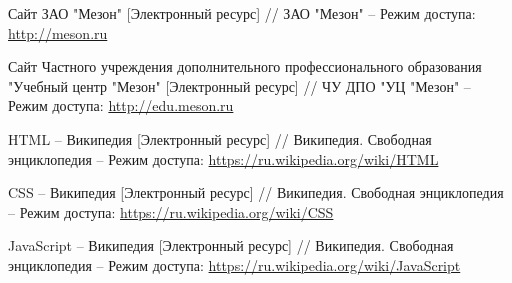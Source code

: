 \begingroup
\renewcommand{\section}[2]{\anonsection{Список использованных источников}}
\begin{thebibliography}{00}
        Сайт ЗАО "Мезон"
        [Электронный ресурс] //
        ЗАО "Мезон"
        --
        Режим доступа:
        \href{http://meson.ru}{http://meson.ru}

        Сайт Частного учреждения дополнительного профессионального образования "Учебный центр "Мезон"
        [Электронный ресурс] //
        ЧУ ДПО "УЦ "Мезон"
        --
        Режим доступа:
        \href{http://edu.meson.ru}{http://edu.meson.ru}

        HTML -- Википедия 
        [Электронный ресурс] //
        Википедия. Свободная энциклопедия
        --
        Режим доступа:
        \href{https://ru.wikipedia.org/wiki/HTML}{https://ru.wikipedia.org/wiki/HTML}

        CSS -- Википедия 
        [Электронный ресурс] //
        Википедия. Свободная энциклопедия
        --
        Режим доступа:
        \href{https://ru.wikipedia.org/wiki/CSS}{https://ru.wikipedia.org/wiki/CSS}
    
        JavaScript -- Википедия 
        [Электронный ресурс] //
        Википедия. Свободная энциклопедия
        --
        Режим доступа:
        \href{https://ru.wikipedia.org/wiki/JavaScript}{https://ru.wikipedia.org/wiki/JavaScript}


\end{thebibliography}
\endgroup

\clearpage
